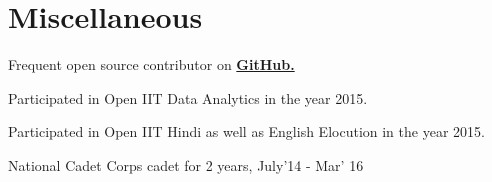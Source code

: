 \documentclass[a4paper]{deedy-resume} %
\begin{document}
\begin{minipage}[t]{0.66\textwidth}
  \section{Miscellaneous}
  \vspace{\topsep}
  \begin{tightitemize}
  \item Frequent open source contributor on \href{https://github.com/kaustubhhiware}{\bf GitHub.}
  \item Participated in Open IIT Data Analytics in the year 2015.
  \item Participated in Open IIT Hindi as well as English Elocution in the year 2015.
  \item National Cadet Corps cadet for 2 years, July'14 - Mar' 16  
  \end{tightitemize}
\end{minipage}
\end{document}
